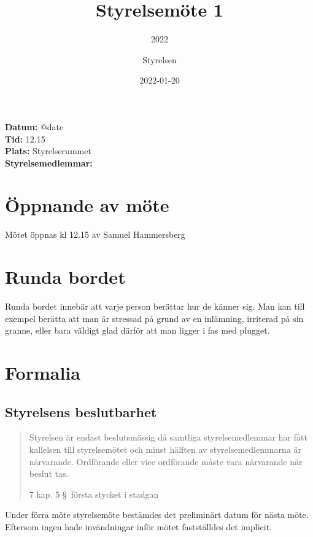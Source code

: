 \documentclass[protokoll]{dvd}
\begin{document}
\title{Styrelsemöte 1}
\subtitle{2022}
\author{Styrelsen}
\date{2022-01-20}

\textbf{Datum:} \csname @date\endcsname\\
\textbf{Tid:} 12.15\\
\textbf{Plats:} Styrelserummet\\
\textbf{Styrelsemedlemmar:}
\begin{närvarande_förtroendevalda}
\end{närvarande_förtroendevalda}


\section{Öppnande av möte}

Mötet öppnas kl 12.15 av Samuel Hammersberg

\section{Runda bordet}

    Runda bordet innebär att varje person berättar hur de känner sig.
    Man kan till exempel berätta att man är stressad på grund av en inlämning, irriterad på sin granne, eller bara väldigt glad därför att man ligger i fas med plugget.

\section{Formalia}

    \subsection{Styrelsens beslutbarhet}

        \blockquote[7 kap. 5 \S~första stycket i stadgan][]{
            Styrelsen är endast beslutsmässig då samtliga styrelsemedlemmar har fått kallelsen till styrelsemötet och minst hälften av styrelsemedlemmarna är närvarande.
            Ordförande eller vice ordförande måste vara närvarande när beslut tas.
        }

        Under förra möte styrelsemöte bestämdes det preliminärt datum för nästa möte. Eftersom ingen hade invändningar inför mötet fastställdes det implicit. 
\end{document}
